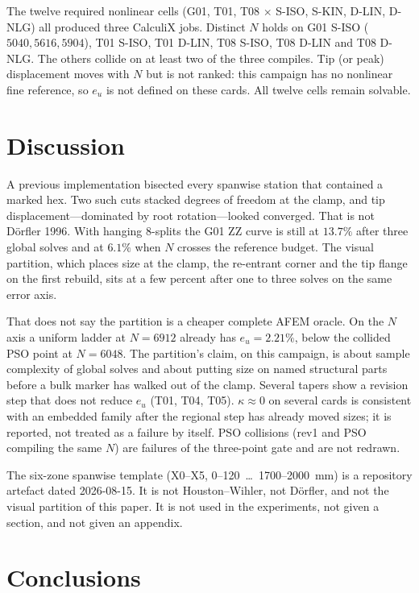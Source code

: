 \documentclass[applsci,article,submit,pdftex,oneauthor]{Definitions/mdpi}
\begin{document}
The twelve required nonlinear cells (G01, T01, T08 $\times$ S-ISO, S-KIN, D-LIN, D-NLG) all produced three CalculiX jobs. Distinct $N$ holds on G01 S-ISO ($5040,5616,5904$), T01 S-ISO, T01 D-LIN, T08 S-ISO, T08 D-LIN and T08 D-NLG. The others collide on at least two of the three compiles. Tip (or peak) displacement moves with $N$ but is not ranked: this campaign has no nonlinear fine reference, so $e_u$ is not defined on these cards. All twelve cells remain solvable.

\section{Discussion}
\label{sec:disc}

A previous implementation bisected every spanwise station that contained a marked hex. Two such cuts stacked degrees of freedom at the clamp, and tip displacement---dominated by root rotation---looked converged. That is not D{\"o}rfler 1996. With hanging 8-splits the G01 ZZ curve is still at $13.7\%$ after three global solves and at $6.1\%$ when $N$ crosses the reference budget. The visual partition, which places size at the clamp, the re-entrant corner and the tip flange on the first rebuild, sits at a few percent after one to three solves on the same error axis.

That does not say the partition is a cheaper complete AFEM oracle. On the $N$ axis a uniform ladder at $N=6912$ already has $e_u=2.21\%$, below the collided PSO point at $N=6048$. The partition's claim, on this campaign, is about sample complexity of global solves and about putting size on named structural parts before a bulk marker has walked out of the clamp. Several tapers show a revision step that does not reduce $e_u$ (T01, T04, T05). $\kappa\approx 0$ on several cards is consistent with an embedded family after the regional step has already moved sizes; it is reported, not treated as a failure by itself. PSO collisions (rev1 and PSO compiling the same $N$) are failures of the three-point gate and are not redrawn.

The six-zone spanwise template (X0--X5, 0--120~\ldots~1700--2000~mm) is a repository artefact dated 2026-08-15. It is not Houston--Wihler, not D{\"o}rfler, and not the visual partition of this paper. It is not used in the experiments, not given a section, and not given an appendix.

\section{Conclusions}
\label{sec:conc}
\end{document}
